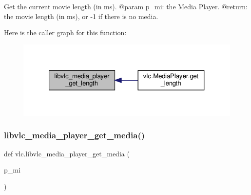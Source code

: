 \begin{DoxyVerb}Get the current movie length (in ms).
@param p_mi: the Media Player.
@return: the movie length (in ms), or -1 if there is no media.
\end{DoxyVerb}
 Here is the caller graph for this function\+:
\nopagebreak
\begin{figure}[H]
\begin{center}
\leavevmode
\includegraphics[width=321pt]{namespacevlc_a203cb0f1728c244d74defe39fabf686d_icgraph}
\end{center}
\end{figure}
\mbox{\label{namespacevlc_afeedcdc930247eca6504d41de3af7275}} 
\subsubsection{\texorpdfstring{libvlc\+\_\+media\+\_\+player\+\_\+get\+\_\+media()}{libvlc\_media\_player\_get\_media()}}
{\footnotesize\ttfamily def vlc.\+libvlc\+\_\+media\+\_\+player\+\_\+get\+\_\+media (\begin{DoxyParamCaption}\item[{}]{p\+\_\+mi }\end{DoxyParamCaption})}

